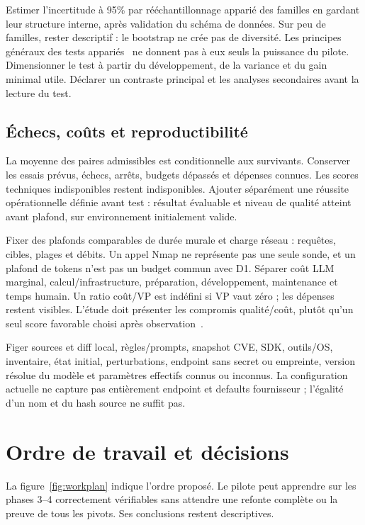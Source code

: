 \documentclass[11pt,a4paper]{article}
\begin{document}
Estimer l'incertitude à 95\% par rééchantillonnage apparié des familles en gardant
leur structure interne, après validation du schéma de données. Sur peu de
familles, rester descriptif : le bootstrap ne crée pas de diversité. Les
principes généraux des tests appariés~\cite{dror} ne donnent pas à eux seuls la
puissance du pilote. Dimensionner le test à partir du développement, de la
variance et du gain minimal utile. Déclarer un contraste principal et les
analyses secondaires avant la lecture du test.

\subsection{Échecs, coûts et reproductibilité}
La moyenne des paires admissibles est conditionnelle aux survivants. Conserver
les essais prévus, échecs, arrêts, budgets dépassés et dépenses connues. Les
scores techniques indisponibles restent indisponibles. Ajouter séparément une
réussite opérationnelle définie avant test : résultat évaluable et niveau de
qualité atteint avant plafond, sur environnement initialement valide.

Fixer des plafonds comparables de durée murale et charge réseau : requêtes,
cibles, plages et débits. Un appel Nmap ne représente pas une seule sonde, et un
plafond de tokens n'est pas un budget commun avec D1. Séparer coût LLM marginal,
calcul/infrastructure, préparation, développement, maintenance et temps humain.
Un ratio coût/VP est indéfini si VP vaut zéro ; les dépenses restent visibles.
L'étude doit présenter les compromis qualité/coût, plutôt qu'un seul score
favorable choisi après observation~\cite{matter}.

Figer sources et diff local, règles/prompts, snapshot CVE, SDK, outils/OS,
inventaire, état initial, perturbations, endpoint sans secret ou empreinte,
version résolue du modèle et paramètres effectifs connus ou inconnus. La
configuration actuelle ne capture pas entièrement endpoint et defaults
fournisseur ; l'égalité d'un nom et du hash source ne suffit pas.

\section{Ordre de travail et décisions}
La figure~\ref{fig:workplan} indique l'ordre proposé. Le pilote peut apprendre
sur les phases 3--4 correctement vérifiables sans attendre une refonte complète
ou la preuve de tous les pivots. Ses conclusions restent descriptives.
\end{document}
